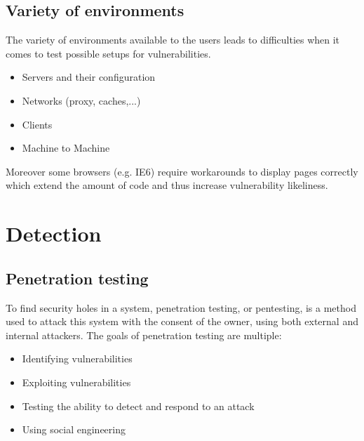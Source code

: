 \subsection{Variety of environments}
The variety of environments available to the users leads to
difficulties when it comes to test possible setups for
vulnerabilities.\\
\begin{itemize}
\item Servers and their configuration
\item Networks (proxy, caches,...)
\item Clients
\item Machine to Machine
\end{itemize}
Moreover some browsers (e.g. IE6) require workarounds to
display pages correctly which extend the amount of code and thus
increase vulnerability likeliness.

\section{Detection}

\subsection{Penetration testing}

To find security holes in a system, penetration testing, or pentesting, is a
method used to attack this system with the consent of the owner, using both
external and internal attackers. The goals of penetration testing are multiple:
\begin{itemize}{} \item Identifying vulnerabilities \item Exploiting
vulnerabilities \item Testing the ability to detect and respond to an attack
\item Using social engineering \end{itemize}

